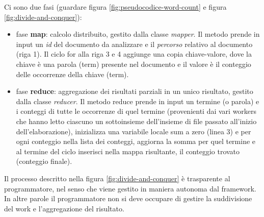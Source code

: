 \documentclass[italian,10pt,a4paper]{report}
\begin{document}
	Ci sono due fasi (guardare figura \ref{fig:pseudocodice-word-count} e figura \ref{fig:divide-and-conquer}): 
	\begin{itemize}
		\item fase \textbf{map}: calcolo distribuito, gestito dalla classe \textit{mapper}. Il metodo prende in input un \textit{id} del documento da analizzare e il \textit{percorso} relativo al documento (riga 1). Il ciclo for alla riga 3 e 4  aggiunge una copia chiave-valore, dove la chiave è una parola (term) presente nel documento e il valore è il conteggio delle occorrenze della chiave (term).
		\item fase \textbf{reduce}: aggregazione dei risultati parziali in un unico risultato, gestito dalla classe \textit{reducer}. Il metodo reduce prende in input un termine (o parola) e i conteggi di tutte le occorrenze di quel termine (provenienti dai vari workers che hanno letto ciascuno un sottoinsieme dell'insieme di file passato all'inizio dell'elaborazione), inizializza una variabile locale sum a zero (linea 3) e per ogni conteggio nella lista dei conteggi, aggiorna la somma per quel termine e al termine del ciclo inserisci nella mappa risultante, il conteggio trovato (conteggio finale).
	\end{itemize}
	Il processo descritto nella figura \ref{fig:divide-and-conquer} è trasparente al programmatore, nel senso che viene gestito in maniera autonoma dal framework. In altre parole il programmatore non si deve occupare di gestire la suddivisione del work e l'aggregazione del risultato.
\end{document}
